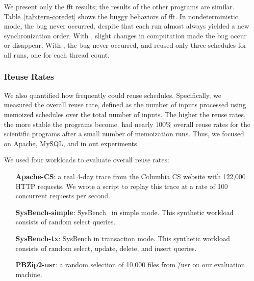 We present only the fft results; the results of the other programs are
similar.  Table~\ref{tab:tern-coredet} shows the buggy behaviors of fft.
  In nondeterministic mode, the bug never
occurred, despite that each run almost always yielded a new
synchronization order. With \coredet, slight changes in computation made the
bug occur or disappear.  With \tern, the bug never occurred, and
\tern reused only three schedules for all runs, one for each
thread count.  



\subsubsection{Reuse Rates} \label{sec:tern-reuse-rate}

We also quantified how frequently \tern could reuse schedules.
Specifically, we measured the overall reuse rate, defined as the number of
inputs processed using memoized schedules over the total number of inputs.
The higher the reuse rates, the more stable the programs become.  \tern had
nearly 100\% overall reuse rates for the scientific programs after a small
number of memoization runs.  Thus, we focused on Apache, MySQL, and \pbzip
in out experiments.

We used four workloads to evaluate overall reuse rates:

\begin{enumerate}

\item[{\bf Apache-CS}:] a real 4-day trace from the Columbia CS website
  with 122,000 HTTP requests.  We wrote a script to replay this trace at a
  rate of 100 concurrent requests per second.

\item[{\bf SysBench-simple}:] SysBench~\cite{sysbench} in simple mode.  This
  synthetic workload consists of random select queries.


\item[{\bf SysBench-tx}:] SysBench in transaction mode.  This synthetic
  workload consists of random select, update, delete, and insert queries.

\item[{\bf PBZip2-usr}:] a random selection of 10,000 files from \v{/usr}
  on our evaluation machine.

\end{enumerate}

